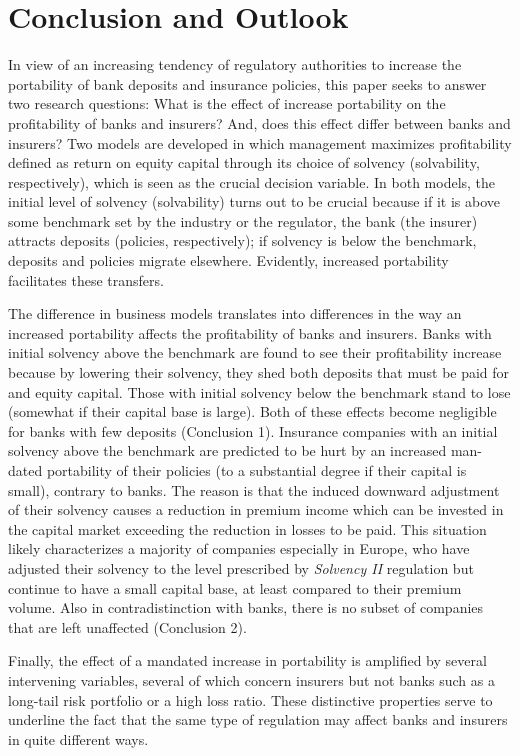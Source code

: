 \section{Conclusion and Outlook}
\label{sec:conclusion}

In view of an increasing tendency of regulatory authorities to increase the portability of bank deposits and insurance policies, this paper seeks to answer two research questions: What is the effect of increase portability on the profitability of banks and insurers? And, does this effect differ between banks and insurers? Two models are developed in which management maximizes profitability defined as return on equity capital through its choice of solvency (solvability, respectively), which is seen as the crucial decision variable. In both models, the initial level of solvency (solvability) turns out to be crucial because if it is above some benchmark set by the industry or the regulator, the bank (the insurer) attracts deposits (policies, respectively); if solvency is below the benchmark, deposits and policies migrate elsewhere.  Evidently, increased portability facilitates these transfers.


The difference in business models translates into differences in the way an increased portability affects the profitability of banks and insurers. Banks with initial solvency above the benchmark are found to see their profitability increase because by lowering their solvency, they shed both deposits that must be paid for and equity capital. Those with initial solvency below the benchmark stand to lose (somewhat if their capital base is large). Both of these effects become negligible for banks with few deposits (Conclusion 1). Insurance companies with an initial solvency above the benchmark are predicted to be hurt by an increased man-dated portability of their policies (to a substantial degree if their capital is small), contrary to banks. The reason is that the induced downward adjustment of their solvency causes a reduction in premium income which can be invested in the capital market exceeding the reduction in losses to be paid. This situation likely characterizes a majority of companies especially in Europe, who have adjusted their solvency to the level prescribed by \textit{Solvency II} regulation but continue to have a small capital base, at least compared to their premium volume. Also in contradistinction with banks, there is no subset of companies that are left unaffected (Conclusion 2).


Finally, the effect of a mandated increase in portability is amplified by several intervening variables, several of which concern insurers but not banks such as a long-tail risk portfolio or a high loss ratio. These distinctive properties serve to underline the fact that the same type of regulation may affect banks and insurers in quite different ways.

